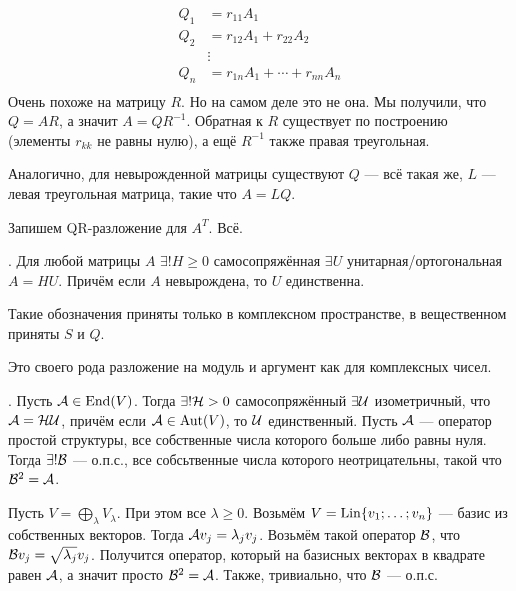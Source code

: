 \documentclass{article}
\begin{document}
\begin{itemize}
\begin{Proof}
\[\begin{split}
                Q_1&=r_{11}A_1\\
                Q_2&=r_{12}A_1+r_{22}A_2\\
                &\vdots\\
                Q_n&=r_{1n}A_1+\cdots+r_{nn}A_n\\
            \end{split}
            \]
            Очень похоже на матрицу $R$. Но на самом деле это не она. Мы получили, что $Q=AR$, а значит $A=QR^{-1}$. Обратная к $R$ существует по построению (элементы $r_{kk}$ не равны нулю), а ещё $R^{-1}$ также правая треугольная.
        \end{Proof}
        \thm Аналогично, для невырожденной матрицы существуют $Q$ --- всё такая же, $L$ --- левая треугольная матрица, такие что $A=LQ$.
        \begin{Proof}
            Запишем QR-разложение для $A^T$. Всё.
        \end{Proof}
        \thm {}. Для любой матрицы $A$ $\exists!H\geqslant0$ самосопряжённая $\exists U$ унитарная/ортогональная $A=HU$. Причём если $A$ невырождена, то $U$ единственна.
        \begin{Comment}
            Такие обозначения приняты только в комплексном пространстве, в вещественном приняты $S$ и $Q$.
        \end{Comment}
        \begin{Comment}
            Это своего рода разложение на модуль и аргумент как для комплексных чисел.
        \end{Comment}
        \thm {}. Пусть ${\mathcal{A}}\in\operatorname{End}(V)$. Тогда $\exists!{\mathcal{H}}>0$ самосопряжённый $\exists{\mathcal{U}}$ изометричный, что ${\mathcal{A}}={\mathcal{H}}{\mathcal{U}}$, причём если ${\mathcal{A}}\in\operatorname{Aut}(V)$, то ${\mathcal{U}}$ единственный.
        \thm Пусть ${\mathcal{A}}$ --- оператор простой структуры, все собственные числа которого больше либо равны нуля. Тогда $\exists!{\mathcal{B}}$ --- о.п.с., все собсьтвенные числа которого неотрицательны, такой что ${\mathcal{B}}^2={\mathcal{A}}$.
        \begin{Proof}
            Пусть $V=\bigoplus\limits_{\lambda}V_\lambda$. При этом все $\lambda\geqslant0$. Возьмём $V=\operatorname{Lin}\{v_1;\ldots;v_n\}$ --- базис из собственных векторов. Тогда ${\mathcal{A}} v_j=\lambda_jv_j$. Возьмём такой оператор ${\mathcal{B}}$, что ${\mathcal{B}} v_j=\sqrt{\lambda_j}v_j$. Получится оператор, который на базисных векторах в квадрате равен ${\mathcal{A}}$, а значит просто ${\mathcal{B}}^2={\mathcal{A}}$. Также, тривиально, что ${\mathcal{B}}$ --- о.п.с.\\

\end{Proof}
\end{itemize}
\end{document}
